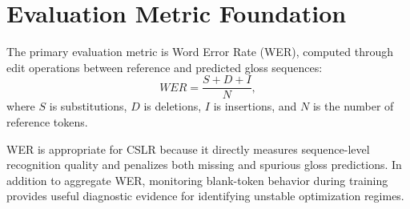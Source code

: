 \section{Evaluation Metric Foundation}

The primary evaluation metric is Word Error Rate (WER), computed through edit operations between reference and predicted gloss sequences:
\begin{equation}
WER = \frac{S + D + I}{N},
\end{equation}
where $S$ is substitutions, $D$ is deletions, $I$ is insertions, and $N$ is the number of reference tokens.

WER is appropriate for CSLR because it directly measures sequence-level recognition quality and penalizes both missing and spurious gloss predictions. In addition to aggregate WER, monitoring blank-token behavior during training provides useful diagnostic evidence for identifying unstable optimization regimes.
